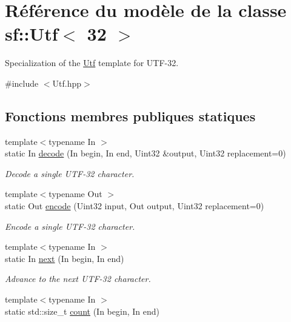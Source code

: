 \hypertarget{classsf_1_1Utf_3_0132_01_4}{}\section{Référence du modèle de la classe sf\+:\+:Utf$<$ 32 $>$}
\label{classsf_1_1Utf_3_0132_01_4}


Specialization of the \hyperlink{classsf_1_1Utf}{Utf} template for U\+T\+F-\/32.  




{\ttfamily \#include $<$Utf.\+hpp$>$}

\subsection*{Fonctions membres publiques statiques}
\begin{DoxyCompactItemize}
\item 
{\footnotesize template$<$typename In $>$ }\\static In \hyperlink{classsf_1_1Utf_3_0132_01_4_ad754ce8476f7b80563890dec12cefd46}{decode} (In begin, In end, Uint32 \&output, Uint32 replacement=0)
\begin{DoxyCompactList}\small\item\em Decode a single U\+T\+F-\/32 character. \end{DoxyCompactList}\item 
{\footnotesize template$<$typename Out $>$ }\\static Out \hyperlink{classsf_1_1Utf_3_0132_01_4_a27b9d3f3fc49a8c88d91966889fcfca1}{encode} (Uint32 input, Out output, Uint32 replacement=0)
\begin{DoxyCompactList}\small\item\em Encode a single U\+T\+F-\/32 character. \end{DoxyCompactList}\item 
{\footnotesize template$<$typename In $>$ }\\static In \hyperlink{classsf_1_1Utf_3_0132_01_4_a788b4ebc728dde2aaba38f3605d4867c}{next} (In begin, In end)
\begin{DoxyCompactList}\small\item\em Advance to the next U\+T\+F-\/32 character. \end{DoxyCompactList}\item 
{\footnotesize template$<$typename In $>$ }\\static std\+::size\+\_\+t \hyperlink{classsf_1_1Utf_3_0132_01_4_a9b18c32b9e6d4b3126e9b4af45988b55}{count} (In begin, In end)

\end{DoxyCompactItemize}
